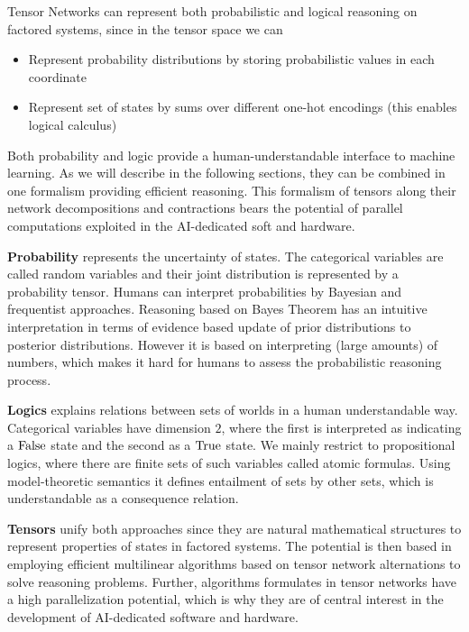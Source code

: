 Tensor Networks can represent both probabilistic and logical reasoning on factored systems, since in the tensor space we can
\begin{itemize}
	\item Represent probability distributions by storing probabilistic values in each coordinate
	\item Represent set of states by sums over different one-hot encodings (this enables logical calculus)
\end{itemize}



Both probability and logic provide a human-understandable interface to machine learning. 
As we will describe in the following sections, they can be combined in one formalism providing efficient reasoning.
This formalism of tensors along their network decompositions and contractions bears the potential of parallel computations exploited in the AI-dedicated soft and hardware. 


\textbf{Probability} represents the uncertainty of states.
The categorical variables are called random variables and their joint distribution is represented by a probability tensor.
Humans can interpret probabilities by Bayesian and frequentist approaches.
Reasoning based on Bayes Theorem has an intuitive interpretation in terms of evidence based update of prior distributions to posterior distributions.
However it is based on interpreting (large amounts) of numbers, which makes it hard for humans to assess the probabilistic reasoning process.

\textbf{Logics} explains relations between sets of worlds in a human understandable way.
Categorical variables have dimension $2$, where the first is interpreted as indicating a $\mathrm{False}$ state and the second as a $\mathrm{True}$ state.
We mainly restrict to propositional logics, where there are finite sets of such variables called atomic formulas.
Using model-theoretic semantics it defines entailment of sets by other sets, which is understandable as a consequence relation.

\textbf{Tensors} unify both approaches since they are natural mathematical structures to represent properties of states in factored systems. 
The potential is then based in employing efficient multilinear algorithms based on tensor network alternations to solve reasoning problems.
Further, algorithms formulates in tensor networks have a high parallelization potential, which is why they are of central interest in the development of AI-dedicated software and hardware.


